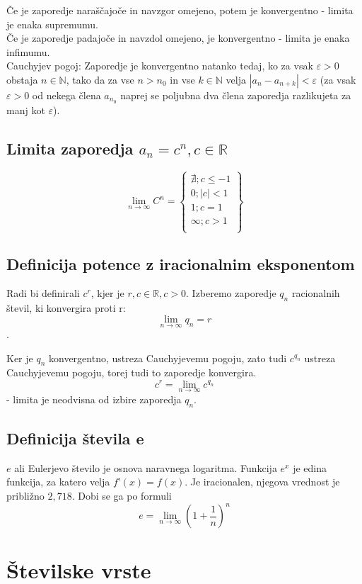 \documentclass[12pt]{report}
\newcommand{\N}{\mathbb{N}}
\newcommand{\R}{\mathbb{R}}
\begin{document}
Če je zaporedje naraščajoče in navzgor omejeno, potem je konvergentno - limita je enaka supremumu. \\
Če je zaporedje padajoče in navzdol omejeno, je konvergentno - limita je enaka infimumu.\\
\bigbreak
Cauchyjev pogoj: Zaporedje je konvergentno natanko tedaj, ko za vsak $\varepsilon > 0$ obstaja $n\in \N$, tako da za vse $n > n_0$ in vse $k \in \N$ velja $|a_n - a_{n+k}| < \varepsilon$ (za vsak $\varepsilon > 0$ od nekega člena $a_{n_0}$ naprej se poljubna dva člena zaporedja razlikujeta za manj kot $\varepsilon$). 

\section*{Limita zaporedja $a_n=c^n, c \in \R$}

 \[\lim_{n \to \infty}C^n= \begin{Bmatrix}
  \nexists; c\leq-1 \\
  0; |c| < 1 \\
  1; c = 1 \\
  \infty; c > 1 \\
 \end{Bmatrix}\]

\section*{Definicija potence z iracionalnim eksponentom}
Radi bi definirali $c^r$, kjer je $r, c \in \R, c > 0$.
Izberemo zaporedje ${q_n}$ racionalnih števil, ki konvergira proti r:
\[\lim_{n \to \infty} q_n = r\].

Ker je ${q_n}$ konvergentno, ustreza Cauchyjevemu pogoju, zato tudi ${c^{q_n}}$ ustreza Cauchyjevemu pogoju, torej tudi to zaporedje konvergira.
\[c^r = \lim_{n \to \infty} c^{q_n}\] - limita je neodvisna od izbire zaporedja $q_n$.

\section*{Definicija števila e}
$e$ ali Eulerjevo število je osnova naravnega logaritma. Funkcija $e^x$ je edina funkcija, za katero velja $f’(x)=f(x)$. Je iracionalen, njegova vrednost je približno $2,718$. Dobi se ga po formuli
\[e=\lim_{n \to \infty}(1+\frac{1}{n})^n\]
 



\chapter*{Številske vrste}
\end{document}
